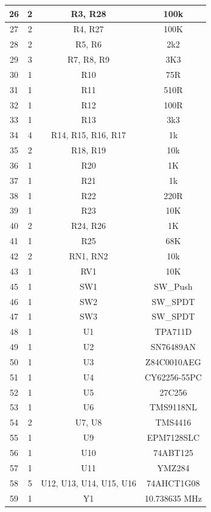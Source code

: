\begin{footnotesize}
\begin{longtable}{ |*{4}{c|} }
\hline
{26} & {2} & {R3, R28} & {100k} \\
\hline
{27} & {2} & {R4, R27} & {100K} \\
\hline
{28} & {2} & {R5, R6} & {2k2} \\
\hline
{29} & {3} & {R7, R8, R9} & {3K3} \\
\hline
{30} & {1} & {R10} & {75R} \\
\hline
{31} & {1} & {R11} & {510R} \\
\hline
{32} & {1} & {R12} & {100R} \\
\hline
{33} & {1} & {R13} & {3k3} \\
\hline
{34} & {4} & {R14, R15, R16, R17} & {1k} \\
\hline
{35} & {2} & {R18, R19} & {10k} \\
\hline
{36} & {1} & {R20} & {1K} \\
\hline
{37} & {1} & {R21} & {1k} \\
\hline
{38} & {1} & {R22} & {220R} \\
\hline
{39} & {1} & {R23} & {10K} \\
\hline
{40} & {2} & {R24, R26} & {1K} \\
\hline
{41} & {1} & {R25} & {68K} \\
\hline
{42} & {2} & {RN1, RN2} & {10k} \\
\hline
{43} & {1} & {RV1} & {10K} \\
\hline
{45} & {1} & {SW1} & {SW\_Push} \\
\hline
{46} & {1} & {SW2} & {SW\_SPDT} \\
\hline
{47} & {1} & {SW3} & {SW\_SPDT} \\
\hline
{48} & {1} & {U1} & {TPA711D} \\
\hline
{49} & {1} & {U2} & {SN76489AN} \\
\hline
{50} & {1} & {U3} & {Z84C0010AEG} \\
\hline
{51} & {1} & {U4} & {CY62256-55PC} \\
\hline
{52} & {1} & {U5} & {27C256} \\
\hline
{53} & {1} & {U6} & {TMS9118NL} \\
\hline
{54} & {2} & {U7, U8} & {TMS4416} \\
\hline
{55} & {1} & {U9} & {EPM7128SLC} \\
\hline
{56} & {1} & {U10} & {74ABT125} \\
\hline
{57} & {1} & {U11} & {YMZ284} \\
\hline
{58} & {5} & {U12, U13, U14, U15, U16} & {74AHCT1G08} \\
\hline
{59} & {1} & {Y1} & {10.738635 MHz} \\
\hline
\end{longtable}
\end{footnotesize}

